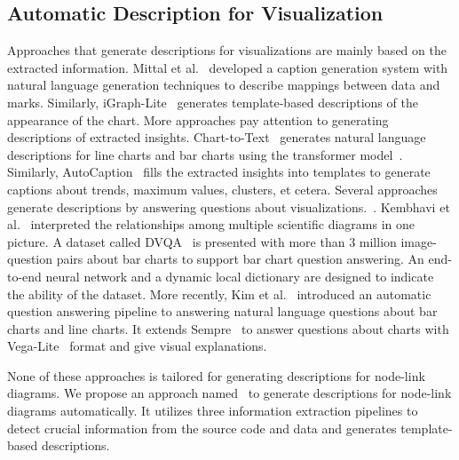 \subsection{Automatic Description for Visualization}
Approaches that generate descriptions for visualizations are mainly based on the extracted information.
Mittal et al.~\cite{DBLP:journals/coling/MittalMCR98} developed a caption generation system with natural language generation techniques to describe mappings between data and marks.
Similarly, iGraph-Lite~\cite{DBLP:journals/tochi/FerresLST13} generates template-based descriptions of the appearance of the chart.
More approaches pay attention to generating descriptions of extracted insights.
Chart-to-Text~\cite{DBLP:conf/inlg/ObeidH20} generates natural language descriptions for line charts and bar charts using the transformer model~\cite{DBLP:conf/nips/VaswaniSPUJGKP17}. 
Similarly, AutoCaption~\cite{DBLP:conf/apvis/LiuXHWY20} fills the extracted insights into templates to generate captions about trends, maximum values, clusters, et cetera. 
Several approaches generate descriptions by answering questions about visualizations.~\cite{DBLP:conf/cvpr/KaflePCK18, DBLP:conf/chi/KimHA20, DBLP:conf/eccv/KembhaviSKSHF16}.
Kembhavi et al.~\cite{DBLP:conf/eccv/KembhaviSKSHF16} interpreted the relationships among multiple scientific diagrams in one picture. 
A dataset called DVQA~\cite{DBLP:conf/cvpr/KaflePCK18} is presented with more than 3 million image-question pairs about bar charts to support bar chart question answering. 
An end-to-end neural network and a dynamic local dictionary are designed to indicate the ability of the dataset.
More recently, Kim et al.~\cite{DBLP:conf/chi/KimHA20} introduced an automatic question answering pipeline to answering natural language questions about bar charts and line charts. It extends Sempre~\cite{DBLP:conf/acl/PasupatL15, DBLP:conf/emnlp/ZhangPL17} to answer questions about charts with Vega-Lite~\cite{DBLP:journals/tvcg/SatyanarayanMWH17} format and give visual explanations.

None of these approaches is tailored for generating descriptions for node-link diagrams. 
We propose an approach named \ApproachName~to generate descriptions for node-link diagrams automatically.
It utilizes three information extraction pipelines to detect crucial information from the source code and data and generates template-based descriptions.